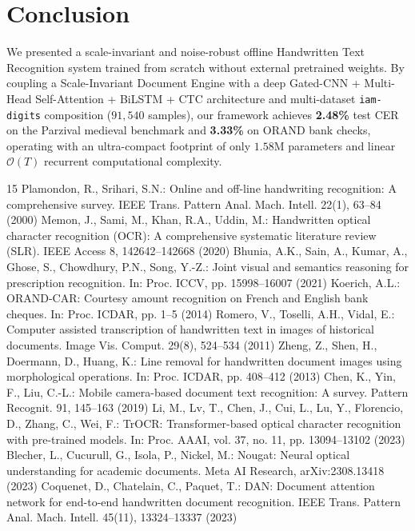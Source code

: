\documentclass[default,iicol,sn-basic]{sn-jnl}
\begin{document}
{\section{Conclusion}\label{sec4}
We presented a scale-invariant and noise-robust offline Handwritten Text Recognition system trained from scratch without external pretrained weights. By coupling a Scale-Invariant Document Engine with a deep Gated-CNN + Multi-Head Self-Attention + BiLSTM + CTC architecture and multi-dataset \texttt{iam-digits} composition ($91,540$ samples), our framework achieves \textbf{2.48\%} test CER on the Parzival medieval benchmark and \textbf{3.33\%} on ORAND bank checks, operating with an ultra-compact footprint of only $1.58\text{M}$ parameters and linear $\mathcal{O}(T)$ recurrent computational complexity.

\begin{thebibliography}{15}
 Plamondon, R., Srihari, S.N.: Online and off-line handwriting recognition: A comprehensive survey. IEEE Trans. Pattern Anal. Mach. Intell. 22(1), 63--84 (2000)
 Memon, J., Sami, M., Khan, R.A., Uddin, M.: Handwritten optical character recognition (OCR): A comprehensive systematic literature review (SLR). IEEE Access 8, 142642--142668 (2020)
 Bhunia, A.K., Sain, A., Kumar, A., Ghose, S., Chowdhury, P.N., Song, Y.-Z.: Joint visual and semantics reasoning for prescription recognition. In: Proc. ICCV, pp. 15998--16007 (2021)
 Koerich, A.L.: ORAND-CAR: Courtesy amount recognition on French and English bank cheques. In: Proc. ICDAR, pp. 1--5 (2014)
 Romero, V., Toselli, A.H., Vidal, E.: Computer assisted transcription of handwritten text in images of historical documents. Image Vis. Comput. 29(8), 524--534 (2011)
 Zheng, Z., Shen, H., Doermann, D., Huang, K.: Line removal for handwritten document images using morphological operations. In: Proc. ICDAR, pp. 408--412 (2013)
 Chen, K., Yin, F., Liu, C.-L.: Mobile camera-based document text recognition: A survey. Pattern Recognit. 91, 145--163 (2019)
 Li, M., Lv, T., Chen, J., Cui, L., Lu, Y., Florencio, D., Zhang, C., Wei, F.: TrOCR: Transformer-based optical character recognition with pre-trained models. In: Proc. AAAI, vol. 37, no. 11, pp. 13094--13102 (2023)
 Blecher, L., Cucurull, G., Isola, P., Nickel, M.: Nougat: Neural optical understanding for academic documents. Meta AI Research, arXiv:2308.13418 (2023)
 Coquenet, D., Chatelain, C., Paquet, T.: DAN: Document attention network for end-to-end handwritten document recognition. IEEE Trans. Pattern Anal. Mach. Intell. 45(11), 13324--13337 (2023)

\end{thebibliography}}
\end{document}
